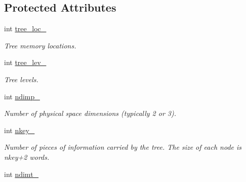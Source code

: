 \subsection*{Protected Attributes}
\begin{DoxyCompactItemize}
\item 
\hypertarget{classTree__Header_aa165ee770e4080623c7d5f0bbb26e112}{
int \hyperlink{classTree__Header_aa165ee770e4080623c7d5f0bbb26e112}{tree\_\-loc\_\-}}
\label{classTree__Header_aa165ee770e4080623c7d5f0bbb26e112}

\begin{DoxyCompactList}\small\item\em Tree memory locations. \item\end{DoxyCompactList}\item 
\hypertarget{classTree__Header_ae34b890a2ee5dc2db4993e7a1f030742}{
int \hyperlink{classTree__Header_ae34b890a2ee5dc2db4993e7a1f030742}{tree\_\-lev\_\-}}
\label{classTree__Header_ae34b890a2ee5dc2db4993e7a1f030742}

\begin{DoxyCompactList}\small\item\em Tree levels. \item\end{DoxyCompactList}\item 
\hypertarget{classTree__Header_a7a8cfae962f92cf73e86946235f649d2}{
int \hyperlink{classTree__Header_a7a8cfae962f92cf73e86946235f649d2}{ndimp\_\-}}
\label{classTree__Header_a7a8cfae962f92cf73e86946235f649d2}

\begin{DoxyCompactList}\small\item\em Number of physical space dimensions (typically 2 or 3). \item\end{DoxyCompactList}\item 
\hypertarget{classTree__Header_a1759b541ad1f2c1d4af7628c64085eb1}{
int \hyperlink{classTree__Header_a1759b541ad1f2c1d4af7628c64085eb1}{nkey\_\-}}
\label{classTree__Header_a1759b541ad1f2c1d4af7628c64085eb1}

\begin{DoxyCompactList}\small\item\em Number of pieces of information carried by the tree. The size of each node is nkey+2 words. \item\end{DoxyCompactList}\item 
\hypertarget{classTree__Header_a9a2b7a443a6fefb534b6b77ba6d1e204}{
int \hyperlink{classTree__Header_a9a2b7a443a6fefb534b6b77ba6d1e204}{ndimt\_\-}}
\label{classTree__Header_a9a2b7a443a6fefb534b6b77ba6d1e204}


\end{DoxyCompactItemize}
